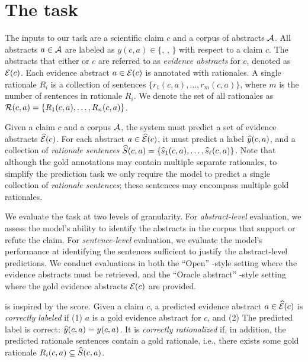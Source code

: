 \section{The \ours task} \label{sec:task_definition}
\vspace{.2cm}  The inputs to our task are a scientific claim $c$ and a corpus of abstracts ${\mathcal{A}}$.
All abstracts $a \in {\mathcal{A}}$ are labeled as $y(c, a)\in\{$\supports, , \notenough$\}$ with respect to a claim $c$.  The abstracts that either \support or  $c$ are referred to as \emph{evidence abstracts} for $c$, denoted as ${\mathcal{E}}(c)$. %
Each evidence abstract $a \in {\mathcal{E}}(c)$ is annotated with rationales. A single rationale $R_i$ is a collection of sentences $\{r_1(c, a), \dots, r_{m}(c, a)\}$, where $m$ is the number of sentences in rationale $R_i$.
We denote the set of all rationales as ${\mathcal{R}}(c, a) = \{R_1(c, a), \dots, R_n(c, a)\}$.

Given a claim $c$ and a corpus ${\mathcal{A}}$, the system must predict a set of evidence abstracts $\widehat{{\mathcal{E}}}(c)$. For each abstract $a \in \widehat{{\mathcal{E}}}(c)$, it must predict a label $\widehat{y}(c, a)$, and a collection of \emph{rationale sentences} $\widehat{S}(c, a) = \{\widehat{s}_1(c, a), \dots, \widehat{s}_{\ell}(c, a)\}$. Note that although the gold annotations may contain multiple separate rationales, to simplify the prediction task we only require the model to predict a single collection of \emph{rationale sentences}; these sentences may encompass multiple gold rationales.


\vspace{.2cm}  \label{sec:evaluation}
We evaluate the task at two levels of granularity. For \emph{abstract-level} evaluation, we assess the model's ability to identify the abstracts in the corpus that support or refute the claim. For \emph{sentence-level} evaluation, we evaluate the model's performance at identifying the sentences sufficient to justify the abstract-level predictions. We conduct evaluations in both the ``Open'' \fever-style \cite{Thorne2018FEVERAL} setting where the evidence abstracts must be retrieved, and the ``Oracle abstract'' \eraser-style \cite{DeYoung2019ERASERAB} setting where the gold evidence abstracts ${\mathcal{E}}(c)$ are provided.


\vspace{.2cm}  is inspired by the \fever score. Given a claim $c$, a predicted evidence abstract $a \in \widehat{{\mathcal{E}}}(c)$ is \emph{correctly labeled} if (1) $a$ is a gold evidence abstract for $c$, and (2) The predicted label is correct: $\widehat{y}(c, a) = y(c, a)$. It is \emph{correctly rationalized} if, in addition, the predicted rationale sentences contain a gold rationale, i.e., there exists some gold rationale $R_i(c, a) \subseteq \widehat{S}(c, a)$.

